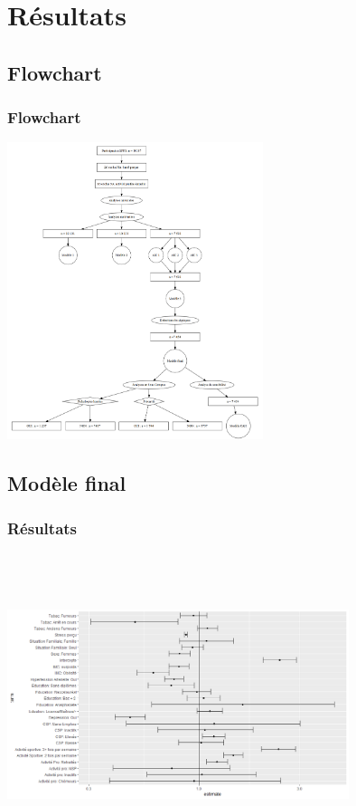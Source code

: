 \documentclass{beamer}
\begin{document}
\section{Résultats}
\subsection{Flowchart}

\begin{frame}
\frametitle{Flowchart}
\pause
\includegraphics[width = 7.5cm]{flowchart.png}
\end{frame}


\subsection{Modèle final}
\begin{frame}
\frametitle{Résultats}
\includegraphics [width = 10cm, height = 8.8cm]{plot_model_final.png}
\end{frame}
\end{document}
